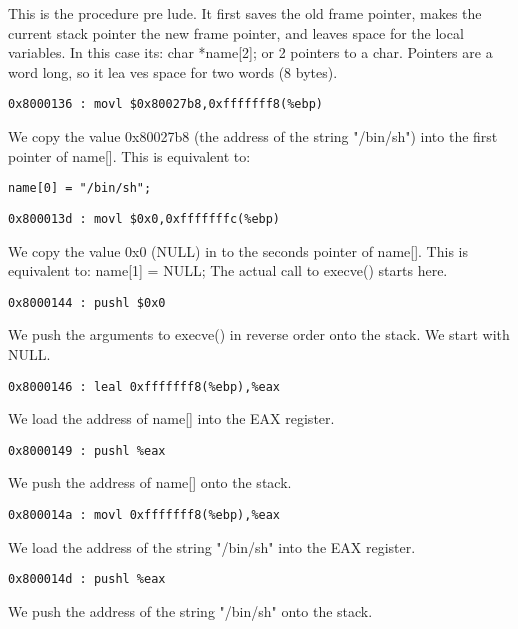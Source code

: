 \documentclass[10pt]{article}
\begin{document}
This is the procedure pre lude. It first saves the old frame pointer, makes the current stack pointer the new frame 
pointer, and leaves space for the local variables. In this case its: char *name[2]; or 2 pointers to a char. Pointers 
are a word long, so it lea ves space for two words (8 bytes).

\begin{lstlisting}
0x8000136 : movl $0x80027b8,0xfffffff8(%ebp)
\end{lstlisting}

We copy the value 0x80027b8 (the address of the string "/bin/sh") into the first pointer of name[]. This is 
equivalent to: 

\begin{verbatim}
name[0] = "/bin/sh";
\end{verbatim}

\begin{lstlisting}
0x800013d : movl $0x0,0xfffffffc(%ebp)
\end{lstlisting}

We copy the value 0x0 (NULL) in to the seconds pointer of name[].  This is equivalent to: name[1] = NULL; 
The actual call to execve() starts here.

\begin{lstlisting}
0x8000144 : pushl $0x0
\end{lstlisting}

We push the arguments to execve() in reverse order onto the stack. We start with NULL.

\begin{verbatim}
0x8000146 : leal 0xfffffff8(%ebp),%eax
\end{verbatim}

We load the address of name[] into the EAX register.
\begin{verbatim}
0x8000149 : pushl %eax 
\end{verbatim}
We push the address of name[]  onto the stack.

\begin{verbatim}
0x800014a : movl 0xfffffff8(%ebp),%eax
\end{verbatim}

We load the address of the string "/bin/sh" into the EAX register.

\begin{verbatim}
0x800014d : pushl %eax 
\end{verbatim}

We push the address of the string "/bin/sh" onto the stack.
\end{document}
